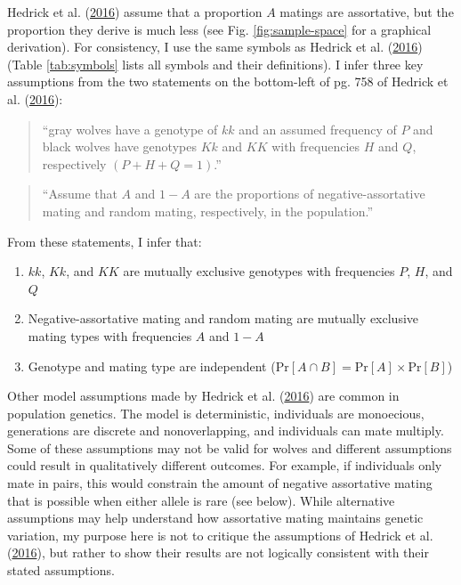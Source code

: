 \documentclass[
]{article}
\providecommand{\tightlist}{%
  \setlength{\itemsep}{0pt}\setlength{\parskip}{0pt}}
\begin{document}
Hedrick et al. (\protect\hyperlink{ref-hedrick_negative-assortative_2016}{2016}) assume that a proportion \(A\) matings are assortative, but the proportion they derive is much less (see Fig. \ref{fig:sample-space} for a graphical derivation). For consistency, I use the same symbols as Hedrick et al. (\protect\hyperlink{ref-hedrick_negative-assortative_2016}{2016}) (Table \ref{tab:symbols} lists all symbols and their definitions). I infer three key assumptions from the two statements on the bottom-left of pg. 758 of Hedrick et al. (\protect\hyperlink{ref-hedrick_negative-assortative_2016}{2016}):

\begin{quote}
``gray wolves have a genotype of \(\mathit{kk}\) and an assumed frequency of \(P\) and black
wolves have genotypes \(\mathit{Kk}\) and \(\mathit{KK}\) with frequencies \(H\) and \(Q\), respectively \((P + H + Q = 1)\).''
\end{quote}

\begin{quote}
``Assume that \(A\) and \(1-A\) are the proportions of negative-assortative mating and random mating, respectively, in the population.''
\end{quote}

From these statements, I infer that:

\begin{enumerate}
\def\labelenumi{\arabic{enumi}.}
\tightlist
\item
  \(\mathit{kk}\), \(\mathit{Kk}\), and \(\mathit{KK}\) are mutually exclusive genotypes with frequencies \(P\), \(H\), and \(Q\)
\item
  Negative-assortative mating and random mating are mutually exclusive mating types with frequencies \(A\) and \(1-A\)
\item
  Genotype and mating type are independent (\(\mathrm{Pr}[A \cap B] = \mathrm{Pr}[A] \times \mathrm{Pr}[B]\))
\end{enumerate}

Other model assumptions made by Hedrick et al. (\protect\hyperlink{ref-hedrick_negative-assortative_2016}{2016}) are common in population genetics. The model is deterministic, individuals are monoecious, generations are discrete and nonoverlapping, and individuals can mate multiply. Some of these assumptions may not be valid for wolves and different assumptions could result in qualitatively different outcomes. For example, if individuals only mate in pairs, this would constrain the amount of negative assortative mating that is possible when either allele is rare (see below). While alternative assumptions may help understand how assortative mating maintains genetic variation, my purpose here is not to critique the assumptions of Hedrick et al. (\protect\hyperlink{ref-hedrick_negative-assortative_2016}{2016}), but rather to show their results are not logically consistent with their stated assumptions.
\end{document}
